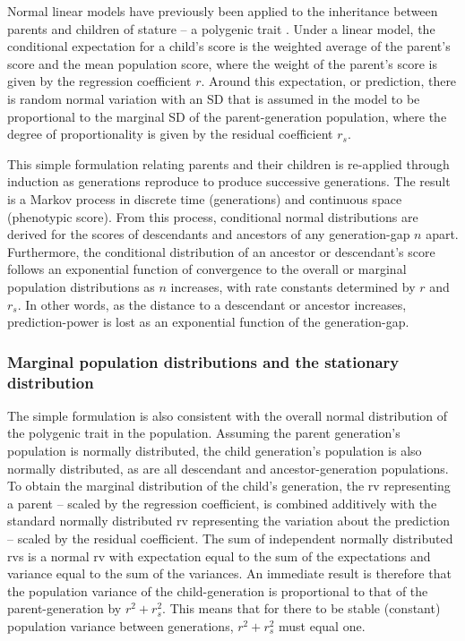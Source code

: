 \documentclass[a4paper,11pt]{article} %
\begin{document}
Normal linear models have previously been applied to the inheritance between parents and children of stature -- a polygenic trait \cite{luo}. Under a linear model, the conditional expectation for a child's score is the weighted average of the parent's score and the mean population score, where the weight of the parent's score is given by the regression coefficient $r$. Around this expectation, or prediction, there is random normal variation with an SD that is assumed in the model to be proportional to the marginal SD of the parent-generation population, where the degree of proportionality is given by the residual coefficient $r_s$. 

This simple formulation relating parents and their children is re-applied through induction as generations reproduce to produce successive generations. The result is a Markov process in discrete time (generations) and continuous space (phenotypic score). From this process, conditional normal distributions are derived for the scores of descendants and ancestors of any generation-gap $n$ apart. Furthermore, the conditional distribution of an ancestor or descendant's score follows an exponential function of convergence to the overall or marginal population distributions as $n$ increases, with rate constants determined by $r$ and $r_s$. In other words, as the distance to a descendant or ancestor increases, prediction-power is lost as an exponential function of the generation-gap. 


\subsubsection*{Marginal population distributions and the stationary distribution}

The simple formulation is also consistent with the overall normal distribution of the polygenic trait in the population. Assuming the parent generation's population is normally distributed, the child generation's population is also normally distributed, as are all descendant and ancestor-generation populations. To obtain the marginal distribution of the child's generation, the rv representing a parent -- scaled by the regression coefficient, is combined additively with the standard normally distributed rv representing the variation about the prediction -- scaled by the residual coefficient. The sum of independent normally distributed rvs is a normal rv with expectation equal to the sum of the expectations and variance equal to the sum of the variances. An immediate result is therefore that the population variance of the child-generation is proportional to that of the parent-generation by $r^2 + r_s^2$. This means that for there to be stable (constant) population variance between generations, $r^2 + r_s^2$ must equal one. 
\end{document}
